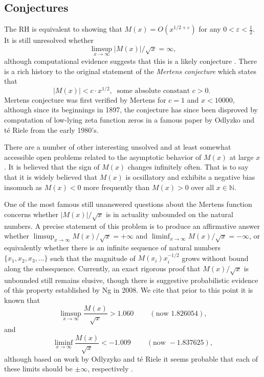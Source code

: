 \documentclass[11pt,reqno,a4letter]{article}
\numberwithin{figure}{section}
\numberwithin{table}{section}
\newcommand{\cf}{\textit{cf.\ }}
\theoremstyle{plain}
\numberwithin{theorem}{section}
\theoremstyle{definition}
\begin{document}
\subsection{Conjectures} 

The RH is equivalent to showing that 
$M(x) = O\left(x^{1/2+\varepsilon}\right)$ for any 
$0 < \varepsilon < \frac{1}{2}$. 
It is still unresolved whether 
\[ 
\limsup_{x\rightarrow\infty} |M(x)| / \sqrt{x} = \infty, 
\] 
although computational evidence suggests that this is a likely conjecture 
\cite{ORDER-MERTENSFN,HURST-2017}. 
There is a rich history to the original statement of the \emph{Mertens conjecture} which 
states that 
\[ 
|M(x)| < c \cdot x^{1/2},\ \text{ some absolute constant $c > 0$. }
\] 
Mertens conjecture was first verified by Mertens for $c = 1$ and $x < 10000$, 
although since its beginnings in 1897, the conjecture has since been disproved by computation 
of low-lying zeta function zeros in a famous paper by 
Odlyzko and t\'{e} Riele from the early 1980's. 

There are a number of other interesting unsolved and at 
least somewhat accessible open problems 
related to the asymptotic behavior of $M(x)$ at large $x$. 
It is believed that the sign of $M(x)$ changes infinitely often. 
That is to say that it is widely believed that $M(x)$ is 
ocsillatory and exhibits a negative bias insomuch as 
$M(x) < 0$ more frequently than $M(x) > 0$ over all 
$x \in \mathbb{N}$. 

One of the most famous still unanswered questions about the Mertens 
function concerns whether $|M(x)| / \sqrt{x}$ is in actuality unbounded on the 
natural numbers. A precise statement of this 
problem is to produce an affirmative answer whether 
$\limsup_{x \rightarrow \infty} M(x) / \sqrt{x} = +\infty$ and 
$\liminf_{x \rightarrow \infty} M(x) / \sqrt{x} = -\infty$, or 
equivalently whether there is an infinite sequence of natural numbers 
$\{x_1, x_2, x_3, \ldots\}$ such that the magnitude of 
$M(x_i) x_i^{-1/2}$ grows without bound along the subsequence. 
Currently, an exact rigorous 
proof that $M(x) / \sqrt{x}$ is unbounded still remains elusive, though there is suggestive probabilistic 
evidence of this property established by Ng in 2008. 
We cite that prior to this point it is known that \cite[\cf \S 4.1]{PRIMEREC} 
\[
\limsup_{x\rightarrow\infty} \frac{M(x)}{\sqrt{x}} > 1.060\ \qquad (\text{now } 1.826054), 
\] 
and 
\[ 
\liminf_{x\rightarrow\infty} \frac{M(x)}{\sqrt{x}} < -1.009\ \qquad (\text{now } -1.837625), 
\] 
although based on work by Odlyzyko and t\'{e} Riele it seems probable that 
each of these limits should be $\pm \infty$, respectively 
\cite{ODLYZ-TRIELE,MREVISITED,ORDER-MERTENSFN,HURST-2017}. 
\end{document}
